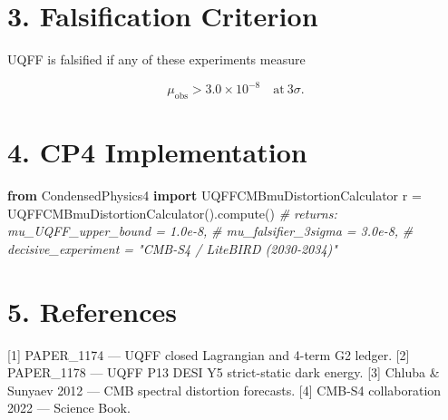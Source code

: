 \documentclass[
  11pt,
]{article}
\newenvironment{Shaded}{}{}
\newcommand{\CommentTok}[1]{\textcolor[rgb]{0.38,0.63,0.69}{\textit{#1}}}
\newcommand{\ImportTok}[1]{\textcolor[rgb]{0.00,0.50,0.00}{\textbf{#1}}}
\newcommand{\NormalTok}[1]{#1}
\newcommand{\OperatorTok}[1]{\textcolor[rgb]{0.40,0.40,0.40}{#1}}
\begin{document}
\section{3. Falsification Criterion}\label{falsification-criterion}

UQFF is falsified if any of these experiments measure

\[
\mu_{\mathrm{obs}} > 3.0 \times 10^{-8} \quad \text{at}\ 3\sigma.
\]

\section{4. CP4 Implementation}\label{cp4-implementation}

\begin{Shaded}
\begin{Highlighting}[]
\ImportTok{from}\NormalTok{ CondensedPhysics4 }\ImportTok{import}\NormalTok{ UQFFCMBmuDistortionCalculator}
\NormalTok{r }\OperatorTok{=}\NormalTok{ UQFFCMBmuDistortionCalculator().compute()}
\CommentTok{\# returns: mu\_UQFF\_upper\_bound = 1.0e{-}8,}
\CommentTok{\#          mu\_falsifier\_3sigma = 3.0e{-}8,}
\CommentTok{\#          decisive\_experiment = "CMB{-}S4 / LiteBIRD (2030{-}2034)"}
\end{Highlighting}
\end{Shaded}

\section{5. References}\label{references}

{[}1{]} PAPER\_1174 --- UQFF closed Lagrangian and 4-term G2 ledger.
{[}2{]} PAPER\_1178 --- UQFF P13 DESI Y5 strict-static dark energy.
{[}3{]} Chluba \& Sunyaev 2012 --- CMB spectral distortion forecasts.
{[}4{]} CMB-S4 collaboration 2022 --- Science Book.




\end{document}
